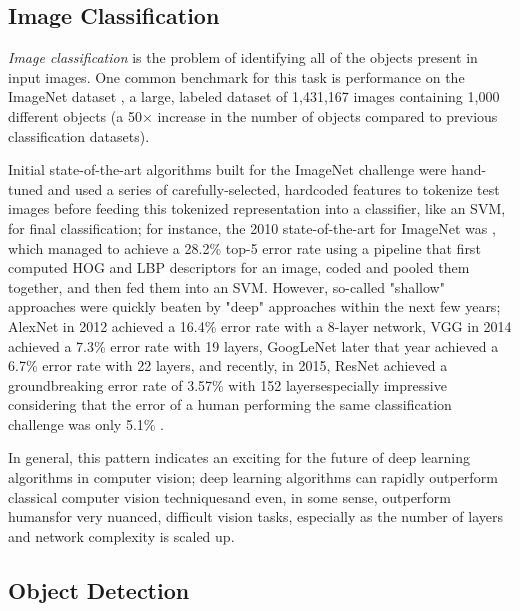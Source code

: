﻿\documentclass{article}
\begin{document}
\subsection{Image Classification}

\textit{Image classification} is the problem of identifying all of the objects present in input images. One common benchmark for this task is performance on the ImageNet dataset \cite{deng2009imagenet}, a large, labeled dataset of 1,431,167 images containing 1,000 different objects (a 50$\times$ increase in the number of objects compared to previous classification datasets).

Initial state-of-the-art algorithms built for the ImageNet challenge were hand-tuned and used a series of carefully-selected, hardcoded features to tokenize test images before feeding this tokenized representation into a classifier, like an SVM, for final classification; for instance, the 2010 state-of-the-art for ImageNet was \cite{lin2011large}, which managed to achieve a 28.2\% top-5 error rate using a pipeline that first computed HOG and LBP descriptors for an image, coded and pooled them together, and then fed them into an SVM. However, so-called "shallow" approaches were quickly beaten by "deep" approaches within the next few years; AlexNet \cite{krizhevsky2012imagenet} in 2012 achieved a 16.4\% error rate with a 8-layer network, VGG \cite{simonyan2014very} in 2014 achieved a 7.3\% error rate with 19 layers, GoogLeNet \cite{szegedy2015going} later that year achieved a 6.7\% error rate with 22 layers, and recently, in 2015, ResNet \cite{he2016deep} achieved a groundbreaking error rate of 3.57\% with 152 layers\textemdash especially impressive considering that the error of a human performing the same classification challenge was only 5.1\% \cite{russakovsky2015imagenet}.

In general, this pattern indicates an exciting for the future of deep learning algorithms in computer vision; deep learning algorithms can rapidly outperform classical computer vision techniques\textemdash and even, in some sense, outperform humans\textemdash for very nuanced, difficult vision tasks, especially as the number of layers and network complexity is scaled up.

\subsection{Object Detection}
\end{document}
